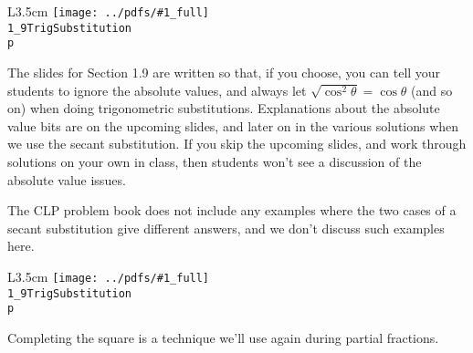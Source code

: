 \documentclass{beamer}
\newcommand{\notefig}[3]{%
	\begin{wrapfigure}{L}{3.5cm}
	\texttt{[image: ../pdfs/\#1\_full]}\\
	\footnotesize
	\texttt{#2}\\
	 \texttt{p \pageref{#3}}
	\end{wrapfigure}
	}
\begin{document}
\begin{frame}
\notefig{1_9TrigSubstitution}{1\_9TrigSubstitution}{note1.9a}

The slides for Section 1.9 are written so that, if you choose, you can tell your students to ignore the absolute values, and always let $\sqrt{\cos^2 \theta}=\cos \theta$ (and so on) when doing trigonometric substitutions. Explanations about the absolute value bits are on the upcoming slides, and later on in the various solutions when we use the secant substitution. If you skip the upcoming slides, and work through solutions on your own in class, then students won't see a discussion of the absolute value issues.

The CLP problem book does not include any examples where the two cases of a secant substitution give different answers, and we don't discuss such examples here. 

\end{frame}
%
\begin{frame}
\notefig{1_9TrigSubstitution}{1\_9TrigSubstitution}{note1.9b}

Completing the square is a technique we'll use again during partial fractions.
\end{frame}
\end{document}
